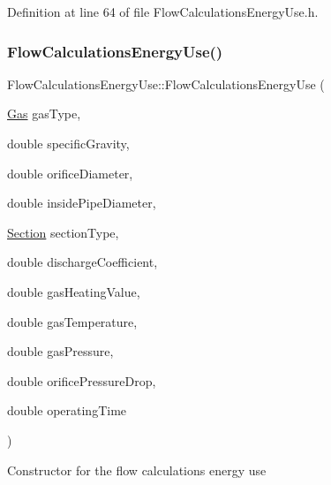 Definition at line 64 of file Flow\+Calculations\+Energy\+Use.\+h.

\mbox{\label{class_flow_calculations_energy_use_a37514554d3cb04764b27d648966de471}} 
\subsubsection{\texorpdfstring{Flow\+Calculations\+Energy\+Use()}{FlowCalculationsEnergyUse()}\hspace{0.1cm}{\footnotesize\ttfamily [3/3]}}
{\footnotesize\ttfamily Flow\+Calculations\+Energy\+Use\+::\+Flow\+Calculations\+Energy\+Use (\begin{DoxyParamCaption}\item[{\hyperlink{class_flow_calculations_energy_use_a840d5a836e7b05d6791b79bace4440f2}{Gas}}]{gas\+Type,  }\item[{double}]{specific\+Gravity,  }\item[{double}]{orifice\+Diameter,  }\item[{double}]{inside\+Pipe\+Diameter,  }\item[{\hyperlink{class_flow_calculations_energy_use_afbabab0da698748de91369a5dfc7662a}{Section}}]{section\+Type,  }\item[{double}]{discharge\+Coefficient,  }\item[{double}]{gas\+Heating\+Value,  }\item[{double}]{gas\+Temperature,  }\item[{double}]{gas\+Pressure,  }\item[{double}]{orifice\+Pressure\+Drop,  }\item[{double}]{operating\+Time }\end{DoxyParamCaption})\hspace{0.3cm}{\ttfamily [inline]}}

Constructor for the flow calculations energy use


